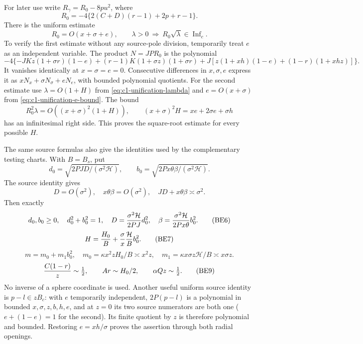 For later use write $R_\gamma=R_0-8pu^2$, where
\[
 R_0=-4\{2(C+D)(r-1)+2p+r-1\}.
\]
There is the uniform estimate
\begin{equation}\label{eq:c1-unification-R0}
 R_0=O(x+\sigma+e),\qquad
 \lambda>0\ \Longrightarrow\ R_0\sqrt\lambda\in\operatorname{Inf}_c.
\end{equation}
To verify the first estimate without any source-pole division, temporarily
treat $e$ as an independent variable. The product $N=JPR_0$ is the
polynomial
\[
 -4\{-JKz(1+\sigma r)(1-e)
 +(r-1)K(1+\sigma z)(1+\sigma r)
 +J[z(1+xh)(1-e)+(1-r)(1+xhz)]\}.
\]
It vanishes identically at $x=\sigma=e=0$. Consecutive differences
in $x,\sigma,e$ express it as $xN_x+\sigma N_\sigma+eN_e$, with
bounded polynomial quotients. For the second estimate use
$\lambda=O(1+H)$ from \eqref{eq:c1-unification-lambda} and
$e=O(x+\sigma)$ from \eqref{eq:c1-unification-e-bound}. The bound
\[
 R_0^2\lambda=O((x+\sigma)^2(1+H)),\qquad
 (x+\sigma)^2H=xe+2\sigma e+\sigma h
\]
has an infinitesimal right side. This proves the square-root estimate
for every possible $H$.

The same source formulas also give the identities used by the
complementary testing charts. With $B=B_s$, put
\[
 d_0=\sqrt{2PJD/(\sigma^2\mathcal H)},\qquad
 b_0=\sqrt{2Px\theta\beta/(\sigma^2\mathcal H)}.
\]
The source identity gives
\[
 D=O(\sigma^2),\quad x\theta\beta=O(\sigma^2),\quad
 JD+x\theta\beta\asymp\sigma^2.\tag{BE5}
\]
Then exactly
\[
 d_0,b_0\ge0,\quad d_0^2+b_0^2=1,\quad
 D={\sigma^2\mathcal H\over2PJ}d_0^2,\quad
 \beta={\sigma^2\mathcal H\over2Px\theta}b_0^2.\tag{BE6}
\]
\[
 H={H_0\over B}+{\sigma\over x}{\mathcal H\over B}b_0^2.\tag{BE7}
\]
\[
 m=m_0+m_1b_0^2,\quad
 m_0=\kappa x^2zH_0/B\asymp x^2z,\quad
 m_1=\kappa x\sigma z\mathcal H/B\asymp x\sigma z.\tag{BE8}
\]
\[
 {C(1-r)\over z}\sim\tfrac12,\qquad
 Ar\sim H_0/2,\qquad \alpha Qz\sim\tfrac12.\tag{BE9}
\]
No inverse of a sphere coordinate is used. Another useful uniform
source identity is $p-l\in zB_c$: with $e$ temporarily independent,
$2P(p-l)$ is a polynomial in bounded $x,\sigma,z,b,h,e$, and
at $z=0$ its two source numerators are both one
($e+(1-e)=1$ for the second). Its finite quotient by $z$ is
therefore polynomial and bounded. Restoring $e=xh/\sigma$ proves
the assertion through both radial openings.

